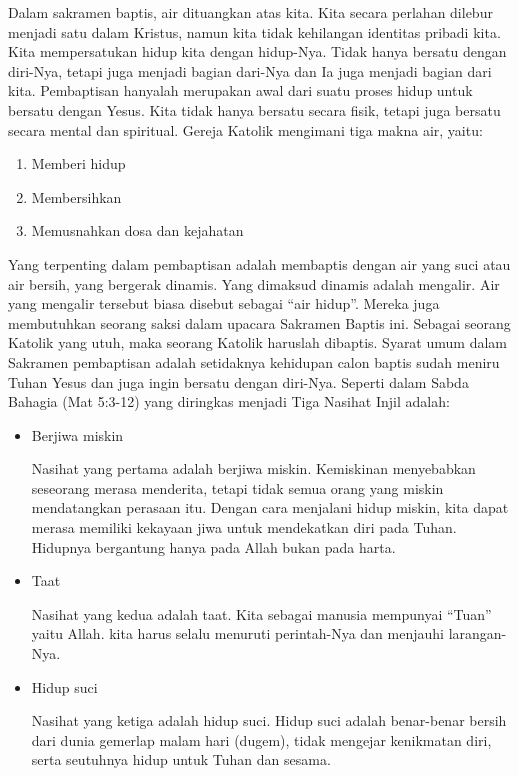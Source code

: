 \documentclass[a4paper,twoside]{article}
\begin{document}
\begin{enumerate}
	Dalam sakramen baptis, air dituangkan atas kita. Kita secara perlahan dilebur menjadi satu dalam Kristus, namun kita tidak kehilangan identitas pribadi kita. Kita mempersatukan hidup kita dengan hidup-Nya. Tidak hanya bersatu dengan diri-Nya, tetapi juga menjadi bagian dari-Nya dan Ia juga menjadi bagian dari kita. Pembaptisan hanyalah merupakan awal dari suatu proses hidup untuk bersatu dengan Yesus. Kita tidak hanya bersatu secara fisik, tetapi juga bersatu secara mental dan spiritual. Gereja Katolik mengimani tiga makna air, yaitu:
	
	\begin{enumerate}
		\item Memberi hidup
		\item Membersihkan
		\item Memusnahkan dosa dan kejahatan
	\end{enumerate} 
	
	Yang terpenting dalam pembaptisan adalah membaptis dengan air yang suci atau air bersih, yang bergerak dinamis. Yang dimaksud dinamis adalah mengalir. Air yang mengalir tersebut biasa disebut sebagai ``air hidup''. Mereka juga membutuhkan seorang saksi dalam upacara Sakramen Baptis ini. Sebagai seorang Katolik yang utuh, maka seorang Katolik haruslah dibaptis. Syarat umum dalam Sakramen pembaptisan adalah setidaknya kehidupan calon baptis sudah meniru Tuhan Yesus dan juga ingin bersatu dengan diri-Nya. Seperti dalam Sabda Bahagia (Mat 5:3-12) yang diringkas menjadi Tiga Nasihat Injil adalah:
	
	\begin{itemize}
		\item Berjiwa miskin
		
		Nasihat yang pertama adalah berjiwa miskin. Kemiskinan menyebabkan seseorang merasa menderita, tetapi tidak semua orang yang miskin mendatangkan perasaan itu. Dengan cara menjalani hidup miskin, kita dapat merasa memiliki kekayaan jiwa untuk mendekatkan diri pada Tuhan. Hidupnya bergantung hanya pada Allah bukan pada harta.
		\item Taat
		
		Nasihat yang kedua adalah taat. Kita sebagai manusia mempunyai ``Tuan'' yaitu Allah. kita harus selalu menuruti perintah-Nya dan menjauhi larangan-Nya.
		\item Hidup suci 
		
		Nasihat yang ketiga adalah hidup suci. Hidup suci adalah benar-benar bersih dari dunia gemerlap malam hari (dugem), tidak mengejar kenikmatan diri, serta seutuhnya hidup untuk Tuhan dan sesama.
	\end{itemize}
	

\end{enumerate}
\end{document}

